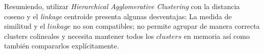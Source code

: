 Resumiendo, utilizar \textit{Hierarchical Agglomerative Clustering} 
con la distancia coseno y el \textit{linkage} centroide presenta algunas
desventajas: La medida de similitud y el $linkage$ no son compatibles;
no permite agrupar de manera correcta clusters colineales y 
necesita mantener todos los $clusters$ en memoria as\'i como tambi\'en
compararlos expl\'icitamente. \\
